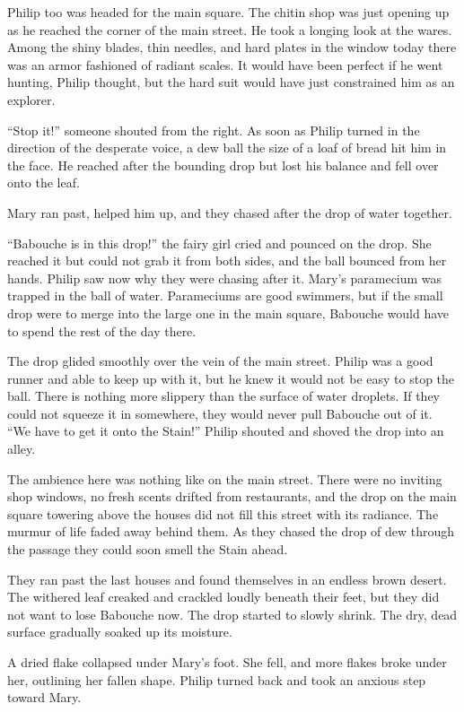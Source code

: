 \documentclass[10pt]{memoir}
\begin{document}
Philip too was headed for the main square. The chitin shop was just opening up
as he reached the corner of the main street. He took a longing look at the
wares. Among the shiny blades, thin needles, and hard plates in the window
today there was an armor fashioned of radiant scales. It would have been
perfect if he went hunting, Philip thought, but the hard suit would have just
constrained him as an explorer.

``Stop it!'' someone shouted from the right. As soon as Philip turned in the
direction of the desperate voice, a dew ball the size of a loaf of bread hit
him in the face. He reached after the bounding drop but lost his balance and
fell over onto the leaf.

Mary ran past, helped him up, and they chased after the drop of water together.

``Babouche is in this drop!'' the fairy girl cried and pounced on the drop. She
reached it but could not grab it from both sides, and the ball bounced from her
hands. Philip saw now why they were chasing after it. Mary's paramecium was
trapped in the ball of water. Parameciums are good swimmers, but if the small
drop were to merge into the large one in the main square, Babouche would have
to spend the rest of the day there.

The drop glided smoothly over the vein of the main street. Philip was a good
runner and able to keep up with it, but he knew it would not be easy to stop
the ball. There is nothing more slippery than the surface of water droplets. If
they could not squeeze it in somewhere, they would never pull Babouche out of
it. ``We have to get it onto the Stain!'' Philip shouted and shoved the drop
into an alley.

The ambience here was nothing like on the main street. There were no inviting
shop windows, no fresh scents drifted from restaurants, and the drop on the
main square towering above the houses did not fill this street with its
radiance. The murmur of life faded away behind them. As they chased the drop of
dew through the passage they could soon smell the Stain ahead.

They ran past the last houses and found themselves in an endless brown desert.
The withered leaf creaked and crackled loudly beneath their feet, but they did
not want to lose Babouche now. The drop started to slowly shrink. The dry, dead
surface gradually soaked up its moisture.

A dried flake collapsed under Mary's foot. She fell, and more flakes broke under
her, outlining her fallen shape. Philip turned back and took an anxious step
toward Mary.
\end{document}
